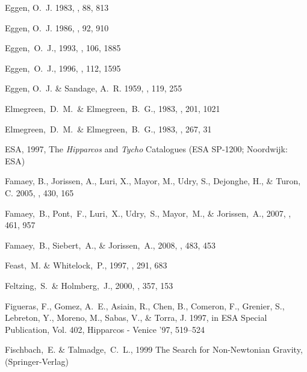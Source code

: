 \begin{thebibliography}{99}
{Eggen}, O.~J. 1983, \aj, 88, 813

{Eggen}, O.~J. 1986, \aj, 92, 910

  Eggen,~O.~J., 1993,
  \aj, 106, 1885

  Eggen,~O.~J., 1996,
  \aj, 112, 1595

{Eggen}, O.~J. \& {Sandage}, A.~R. 1959, \mnras, 119, 255

  Elmegreen,~D.~M.~\& Elmegreen,~B.~G., 1983,
  \mnras, 201, 1021

  Elmegreen,~D.~M.~\& Elmegreen,~B.~G., 1983,
  \apj, 267, 31

{ESA}, 1997, {The \emph{Hipparcos} and \emph{Tycho} Catalogues} (ESA SP-1200; Noordwijk: ESA)

  {Famaey}, B., {Jorissen}, A., {Luri}, X., {Mayor}, M., {Udry}, S., {Dejonghe},
  H., \& {Turon}, C. 2005, \aap, 430, 165

  Famaey,~B., Pont,~F., Luri,~X., Udry,~S., Mayor,~M., \& Jorissen,~A., 2007,
  \aap, 461, 957

  Famaey,~B., Siebert,~A., \& Jorissen,~A., 2008,
  \aap, 483, 453

 Feast,~M. \& Whitelock,~P., 1997,
  \mnras, 291, 683

  Feltzing,~S.~\& Holmberg,~J., 2000,
  \aap, 357, 153
  
{Figueras}, F., {Gomez}, A.~E., {Asiain}, R., {Chen}, B., {Comeron}, F.,
  {Grenier}, S., {Lebreton}, Y., {Moreno}, M., {Sabas}, V., \& {Torra}, J.
  1997, in ESA Special Publication, Vol. 402, Hipparcos - Venice '97, 519--524

  Fischbach,~E. \& Talmadge,~C.~L., 1999
  The Search for Non-Newtonian Gravity,
  (Springer-Verlag)


\end{thebibliography}
